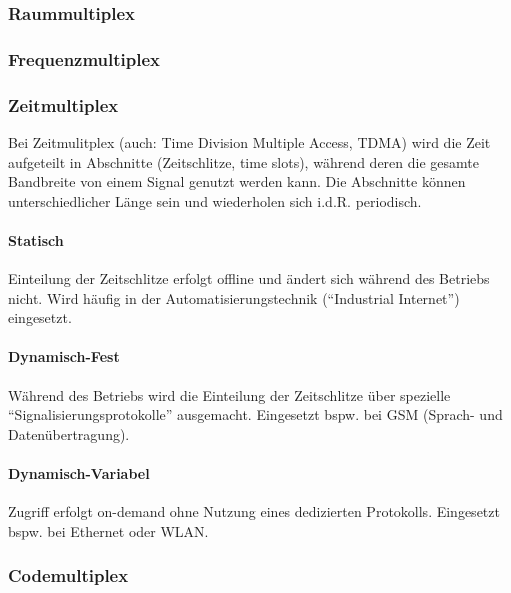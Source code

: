 \documentclass[a4paper, 14pt]{article}
\begin{document}
	\subsubsection{Raummultiplex}


	\subsubsection{Frequenzmultiplex}


	\subsubsection{Zeitmultiplex}

	Bei Zeitmulitplex (auch: Time Division Multiple Access, TDMA) wird die Zeit aufgeteilt in Abschnitte (Zeitschlitze, time slots), während deren die gesamte Bandbreite von einem Signal genutzt werden kann.
	Die Abschnitte können unterschiedlicher Länge sein und wiederholen sich i.d.R. periodisch.

	\paragraph{Statisch}

	Einteilung der Zeitschlitze erfolgt offline und ändert sich während des Betriebs nicht.
	Wird häufig in der Automatisierungstechnik (\enquote{Industrial Internet}) eingesetzt.

	\paragraph{Dynamisch-Fest}

	Während des Betriebs wird die Einteilung der Zeitschlitze über spezielle \enquote{Signalisierungsprotokolle} ausgemacht.
	Eingesetzt bspw. bei GSM (Sprach- und Datenübertragung).

	\paragraph{Dynamisch-Variabel}

	Zugriff erfolgt on-demand ohne Nutzung eines dedizierten Protokolls.
	Eingesetzt bspw. bei Ethernet oder WLAN.

	\subsubsection{Codemultiplex}
\end{document}
